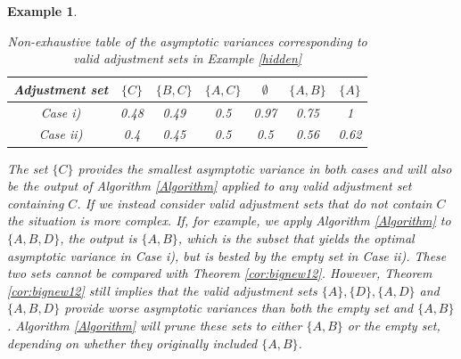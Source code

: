 \documentclass[11pt,a4paper]{article}
\newtheorem{Example}[Satz]{Example}
\theoremstyle{definition}
\theoremstyle{remark}
\newcommand{\g}[1][G]{\mathcal{#1}}
\newcommand{\opt}[2][X,Y]{\mathbf{O}(#1,#2)}
\begin{document}
\begin{Example}
	\begin{table}
		\caption[]{Non-exhaustive table of the asymptotic variances corresponding to valid adjustment sets in Example \ref{hidden} \label{non-exhaustive}}
		\centering
		\begin{tabular}{c | c c c c c c}
			Adjustment set & $\{C\}$ & $\{B,C\}$ & $\{A,C\}$ & $\emptyset$ & $\{A,B\}$ & $\{A\}$  \\
			\hline
			Case i) &  0.48 & 0.49 & 0.5 & 0.97 & 0.75 &  1  \\ 
			Case ii) & 0.4 & 0.45 & 0.5 & 0.5 & 0.56 & 0.62\\
		\end{tabular}
	\end{table}
	
	
	The set $\{C\}$ provides the smallest asymptotic variance in both cases and will also be the output of Algorithm \ref{Algorithm} applied to any valid adjustment set containing $C$. If we instead consider valid adjustment sets that do not contain $C$ the situation is more complex. If, for example, we apply Algorithm \ref{Algorithm} to $\{A,B,D\}$, the output is $\{A,B\}$, which is the subset that yields the optimal asymptotic variance in Case i), but is bested by the empty set in Case ii). These two sets cannot be compared with Theorem \ref{cor:bignew12}. However, Theorem \ref{cor:bignew12} still implies that the valid adjustment sets $\{A\},\{D\},\{A,D\}$ and $\{A,B,D\}$ provide worse asymptotic variances than both the empty set and $\{A,B\}$. Algorithm \ref{Algorithm} will prune these sets to either $\{A,B\}$ or the empty set, depending on whether they originally included $\{A,B\}$. 
	
	
	
	
\end{Example}
\end{document}
